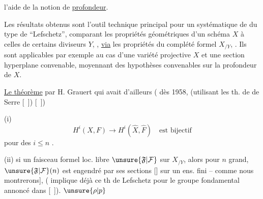 
l'aide de la notion de \uline{profondeur}.

Les résultats  obtenus sont l'outil technique
principal pour un 
 systématique de
 
du type de ``Lefschetz'', comparant les propriétés géométriques
d'un schéma $X$ à celles de certains 
diviseurs $Y$, 
 ,
\uline{via} les propriétés du complété formel $X_{/Y}$, .
Ils sont applicables par exemple
au cas d'une variété projective $X$ et une section hyperplane
convenable, moyennant des hypothèses 
convenables sur la profondeur de $X$.

\uline{Le théorème} 
par H. Grauert qui avait d'ailleurs
( dès 1958,
(utilisant les th. de  de Serre [\ ]) [\ ])

(i) 
\[
H^i(X,F)\longrightarrow H^i(\hat X,\hat F)
\quad\text{est bijectif}
\]
pour des  $i\leq n$
.

(ii) si un faisceau formel loc. libre
$\unsure{\mathfrak F|\mathcal F}$ sur $X_{/Y}$,
alors pour $n$ 
grand, $\unsure{\mathfrak F|\mathcal F}(n)$ est engendré
par ses sections [] sur un ens. fini --
comme nous montrerons],
( implique 
déjà ce th de Lefschetz pour le groupe fondamental annoncé dans [\ ]).
$\unsure{\rho|p}$


